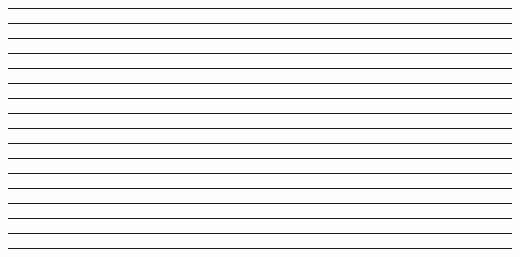 \documentclass{article}
\begin{document}
\newpage
\noindent{}\rule{1cm}{0.025cm}\framebox{\rule{1cm}{1cm}}

\newpage
\noindent{}\rule{1cm}{0.025cm}

\newpage
\noindent{}\rule{1cm}{0.025cm}

\newpage
\noindent{}\rule{1cm}{0.025cm}

\newpage
\noindent{}\rule{1cm}{0.025cm}

\newpage
\noindent{}\rule{1cm}{0.025cm}

\newpage
\noindent{}\rule{1cm}{0.025cm}

\newpage
\noindent{}\rule{1cm}{0.025cm}

\newpage
\noindent{}\rule{1cm}{0.025cm}

\newpage
\noindent{}\rule{1cm}{0.025cm}

\newpage
\noindent{}\rule{1cm}{0.025cm}

\newpage
\noindent{}\rule{1cm}{0.025cm}

\newpage
\noindent{}\rule{1cm}{0.025cm}

\newpage
\noindent{}\rule{1cm}{0.025cm}

\newpage
\noindent{}\rule{1cm}{0.025cm}

\newpage
\noindent{}\rule{1cm}{0.025cm}

\newpage
\noindent{}\rule{1cm}{0.025cm}
\end{document}
